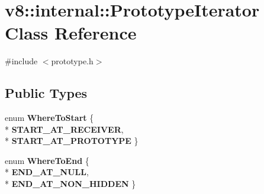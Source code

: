 \hypertarget{classv8_1_1internal_1_1_prototype_iterator}{}\section{v8\+:\+:internal\+:\+:Prototype\+Iterator Class Reference}
\label{classv8_1_1internal_1_1_prototype_iterator}


{\ttfamily \#include $<$prototype.\+h$>$}

\subsection*{Public Types}
\begin{DoxyCompactItemize}
\item 
enum {\bfseries Where\+To\+Start} \{ \\*
{\bfseries S\+T\+A\+R\+T\+\_\+\+A\+T\+\_\+\+R\+E\+C\+E\+I\+V\+ER}, 
\\*
{\bfseries S\+T\+A\+R\+T\+\_\+\+A\+T\+\_\+\+P\+R\+O\+T\+O\+T\+Y\+PE}
 \}\hypertarget{classv8_1_1internal_1_1_prototype_iterator_ac1d06cadd4ffc11f60273f23b4b03bb0}{}\label{classv8_1_1internal_1_1_prototype_iterator_ac1d06cadd4ffc11f60273f23b4b03bb0}

\item 
enum {\bfseries Where\+To\+End} \{ \\*
{\bfseries E\+N\+D\+\_\+\+A\+T\+\_\+\+N\+U\+LL}, 
\\*
{\bfseries E\+N\+D\+\_\+\+A\+T\+\_\+\+N\+O\+N\+\_\+\+H\+I\+D\+D\+EN}
 \}\hypertarget{classv8_1_1internal_1_1_prototype_iterator_a56b39f100d48581d82bcbd824e9e6b34}{}\label{classv8_1_1internal_1_1_prototype_iterator_a56b39f100d48581d82bcbd824e9e6b34}

\end{DoxyCompactItemize}
